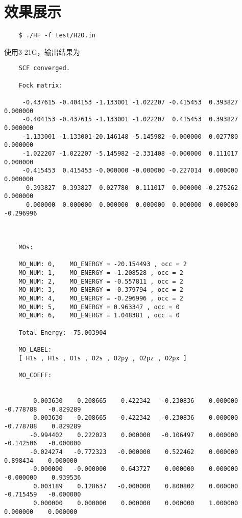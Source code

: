 \documentclass[12pt,a4paper,openany,twoside]{article}
\numberwithin{equation}{section}
\begin{document}
\section{效果展示}
\begin{lstlisting}
    $ ./HF -f test/H2O.in
\end{lstlisting}
使用3-21G，输出结果为
\begin{lstlisting}
    SCF converged.

    Fock matrix:
    
     -0.437615 -0.404153 -1.133001 -1.022207 -0.415453  0.393827  0.000000
     -0.404153 -0.437615 -1.133001 -1.022207  0.415453  0.393827  0.000000
     -1.133001 -1.133001-20.146148 -5.145982 -0.000000  0.027780  0.000000
     -1.022207 -1.022207 -5.145982 -2.331408 -0.000000  0.111017  0.000000
     -0.415453  0.415453 -0.000000 -0.000000 -0.227014  0.000000  0.000000
      0.393827  0.393827  0.027780  0.111017  0.000000 -0.275262  0.000000
      0.000000  0.000000  0.000000  0.000000  0.000000  0.000000 -0.296996
    
    
    
    MOs:
    
    MO_NUM: 0,    MO_ENERGY = -20.154493 , occ = 2
    MO_NUM: 1,    MO_ENERGY = -1.208528 , occ = 2
    MO_NUM: 2,    MO_ENERGY = -0.557811 , occ = 2
    MO_NUM: 3,    MO_ENERGY = -0.379794 , occ = 2
    MO_NUM: 4,    MO_ENERGY = -0.296996 , occ = 2
    MO_NUM: 5,    MO_ENERGY = 0.963347 , occ = 0
    MO_NUM: 6,    MO_ENERGY = 1.048381 , occ = 0
    
    Total Energy: -75.003904
    
    MO_LABEL:
    [ H1s , H1s , O1s , O2s , O2py , O2pz , O2px ]
    
    MO_COEFF:
    
    
        0.003630   -0.208665    0.422342   -0.230836    0.000000   -0.778788   -0.829289
        0.003630   -0.208665   -0.422342   -0.230836    0.000000   -0.778788    0.829289
       -0.994402    0.222023    0.000000   -0.106497    0.000000   -0.142506   -0.000000
       -0.024274   -0.772323   -0.000000    0.522462    0.000000    0.898434    0.000000
       -0.000000   -0.000000    0.643727    0.000000    0.000000   -0.000000    0.939536
        0.003189    0.128637   -0.000000    0.800802    0.000000   -0.715459   -0.000000
        0.000000    0.000000    0.000000    0.000000    1.000000    0.000000    0.000000
\end{lstlisting}


    
\end{document}
